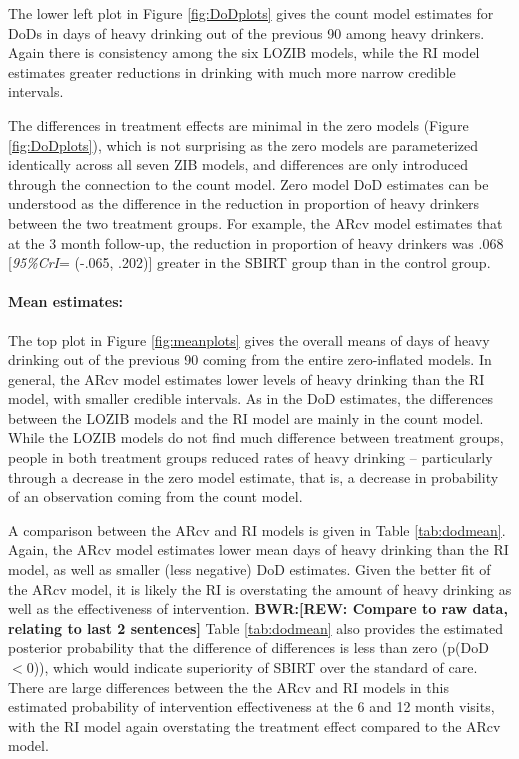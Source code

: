 \documentclass[12pt]{article}
\def\bwr#1{{\color{violet}\textbf{BWR:[#1]}}}
\begin{document}
The lower left plot in Figure \ref{fig:DoDplots} gives the count model estimates for DoDs in days of heavy drinking out of the previous 90 among heavy drinkers. Again there is consistency among the six LOZIB models, while the RI model estimates greater reductions in drinking with much more narrow credible intervals.

The differences in treatment effects are minimal in the zero models (Figure \ref{fig:DoDplots}), which is not surprising as the zero models are parameterized identically across all seven ZIB models, and differences are only introduced through the connection to the count model. Zero model DoD estimates can be understood as the difference in the reduction in proportion of heavy drinkers between the two treatment groups. For example, the ARcv model estimates that at the 3 month follow-up, the reduction in proportion of heavy drinkers was .068 [\textit{95\%CrI}= (-.065, .202)] greater in the SBIRT group than in the control group.

\paragraph{Mean estimates:}

The top plot in Figure \ref{fig:meanplots} gives the overall means of days of heavy drinking out of the previous 90 coming from the entire zero-inflated models. In general, the ARcv model estimates lower levels of heavy drinking than the RI model, with smaller credible intervals. As in the DoD estimates, the differences between the LOZIB models and the RI model are mainly in the count model. While the LOZIB models do not find much difference between treatment groups, people in both treatment groups reduced rates of heavy drinking -- particularly through a decrease in the zero model estimate, that is, a decrease in probability of an observation coming from the count model.

A comparison between the ARcv and RI models is given in Table \ref{tab:dodmean}. Again, the ARcv model estimates lower mean days of heavy drinking than the RI model, as well as smaller (less negative) DoD estimates. Given the better fit of the ARcv model, it is likely the RI is overstating the amount of heavy drinking as well as the effectiveness of intervention. \bwr{REW: Compare to raw data, relating to last 2 sentences} Table \ref{tab:dodmean} also provides the estimated posterior probability that the difference of differences is less than zero (p(DoD$<0$)), which would indicate superiority of SBIRT over the standard of care. There are large differences between the the ARcv and RI models in this estimated probability of intervention effectiveness at the 6 and 12 month visits, with the RI model again overstating the treatment effect compared to the ARcv model. 
\end{document}
